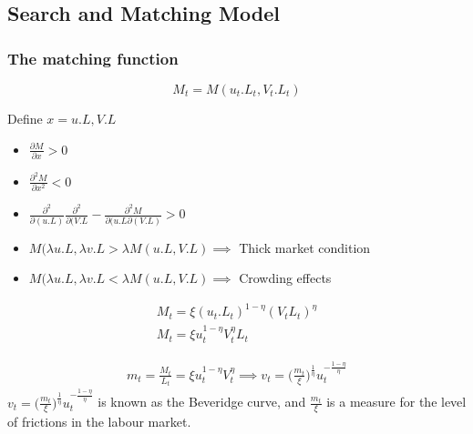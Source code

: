 \newpage
\subsection{Search and Matching Model}
\subsubsection{The matching function}
\begin{equation}\label{Matching_function}
    M_{t}=M(u_{t}.L_{t},V_{t}.L_{t})
\end{equation}

Define $x=u.L, V.L$

\begin{itemize}
    \item $\frac{\partial M}{\partial x}>0$
    \item $\frac{\partial^{2}M}{\partial x^{2}}<0$
    \item $\frac{\partial^{2}}{\partial(u.L)}\frac{\partial^{2}}{\partial(V.L}-\frac{\partial^{2}M}{\partial(u.L\partial(V.L)}>0$
\end{itemize}

\begin{itemize}
    \item $M(\lambda u.L, \lambda v.L>\lambda M(u.L,V.L) \implies$ Thick market condition
    \item $M(\lambda u.L, \lambda v.L<\lambda M(u.L,V.L) \implies$ Crowding effects
\end{itemize}

\begin{equation*}
\begin{aligned}
    M_{t}=\xi(u_{t}.L_{t})^{1-\eta}(V_{t}L_{t})^{\eta} \\
    M_{t}=\xi u_{t}^{1-\eta}V_{t}^{\eta}L_{t} 
\end{aligned}
\end{equation*}

\begin{equation*}
\begin{aligned}
    m_{t}=\frac{M_{t}}{L_{t}}=\xi u_{t}^{1-\eta}V_{t}^{\eta} \implies v_{t}=\big(\frac{m_{t}}{\xi}\big)^{\frac{1}{\eta}}u_{t}^{-\frac{1-\eta}{\eta}}
\end{aligned}
\end{equation*}
$v_{t}=\big(\frac{m_{t}}{\xi}\big)^{\frac{1}{\eta}}u_{t}^{-\frac{1-\eta}{\eta}}$ is known as the Beveridge curve, and $\frac{m_{t}}{\xi}$ is a measure for the level of frictions in the labour market. 

